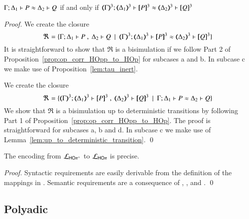 \begin{proposition}\rm
	\label{prop:fulla_HOpp_to_HOp}
	$\Gamma; \Delta_1 \vdash P \approx \Delta_2 \vdash Q$ if and only if $\horel{\tmap{\Gamma}{3}}{\tmap{\Delta_1}{3}}{\pmap{P}{3}}{\wb}{\tmap{\Delta_2}{3}}{\pmap{Q}{3}}$
\end{proposition}

\begin{proof}

	\noi We create the closure
%
	\[
		\Re = \set{\horel{\Gamma}{\Delta_1}{P}{\ ,\ }{\Delta_2}{Q} \setbar \horel{\tmap{\Gamma}{3}}{\tmap{\Delta_1}{3}}{\pmap{P}{3}}{\wb}{\tmap{\Delta_2}{3}}{\pmap{Q}{3}}}
	\]
%
	\noi	It is straightforward to show that $\Re$ is a bisimulation if we follow Part 2 of
		Proposition~\ref{prop:op_corr_HOpp_to_HOp} for subcases a and b.
		In subcase c we make use of Proposition~\ref{lem:tau_inert}.


	\noi We create the closure
%
	\[
		\Re = \set{\horel{\tmap{\Gamma}{3}}{\tmap{\Delta_1}{3}}{\pmap{P}{3}}{\ ,\ }{\tmap{\Delta_2}{3}}{\pmap{Q}{3}} \setbar \horel{\Gamma}{\Delta_1}{P}{\wb}{\Delta_2}{Q}}
	\]
%
	\noi	We show that $\Re$ is a bisimulation up to deterministic transitions
		by following Part 1 of Proposition~\ref{prop:op_corr_HOpp_to_HOp}.
		The proof is straightforward for subcases a, b and d.
		In subcase c we make use of Lemma~\ref{lem:up_to_deterministic_transition}.
	\qed
\end{proof}

\begin{proposition}\rm
	\label{prop:prec:HOpp_to_HOp}
	The encoding from $\mathcal{L}_{\mathsf{HO}\pi^{\mathsf +}}$ to $\mathcal{L}_{\mathsf{HO}\pi}$
	is precise.
\end{proposition}

\begin{proof}
	Syntactic requirements are easily derivable from the
	definition of the mappings in .
	Semantic requirements are a consequence of
	, , and .
	\qed
\end{proof}



\subsection{Polyadic \HOp}
\label{subsec:pol_HOp}


